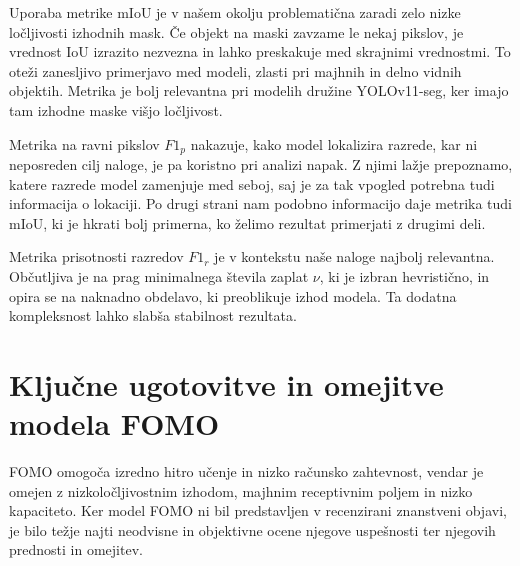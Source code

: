 \documentclass[a4paper,twoside,openright,12pt,slovene]{book}
\begin{document}
        
        Uporaba metrike mIoU je v našem okolju problematična zaradi zelo nizke
        ločljivosti izhodnih mask. Če objekt na maski zavzame le nekaj pikslov,
        je vrednost IoU izrazito nezvezna in lahko preskakuje med skrajnimi
        vrednostmi. To oteži zanesljivo primerjavo med modeli, zlasti pri
        majhnih in delno vidnih objektih. Metrika je bolj relevantna pri
        modelih družine YOLOv11-seg, ker imajo tam izhodne maske višjo
        ločljivost.
        
        Metrika na ravni pikslov \(F1_p\) nakazuje, kako model lokalizira
        razrede, kar ni neposreden cilj naloge, je pa koristno pri analizi
        napak. Z njimi lažje prepoznamo, katere razrede model zamenjuje med
        seboj, saj je za tak vpogled potrebna tudi informacija o lokaciji.
        Po drugi strani nam podobno informacijo daje metrika tudi mIoU, ki je
        hkrati bolj primerna, ko želimo rezultat primerjati z drugimi deli.

        Metrika prisotnosti razredov \(F1_r\) je v kontekstu naše naloge
        najbolj relevantna. Občutljiva je na prag minimalnega števila zaplat
        \(\nu\), ki je izbran hevristično, in opira se na naknadno obdelavo, ki
        preoblikuje izhod modela. Ta dodatna kompleksnost lahko slabša
        stabilnost rezultata.
    
    \section{Ključne ugotovitve in omejitve modela FOMO}
    
        FOMO omogoča izredno hitro učenje in nizko računsko zahtevnost, vendar
        je omejen z nizkoločljivostnim izhodom, majhnim receptivnim poljem in
        nizko kapaciteto.
        Ker model FOMO ni bil predstavljen v recenzirani znanstveni objavi, je
        bilo težje najti neodvisne in objektivne ocene njegove uspešnosti ter
        njegovih prednosti in omejitev.
\end{document}
